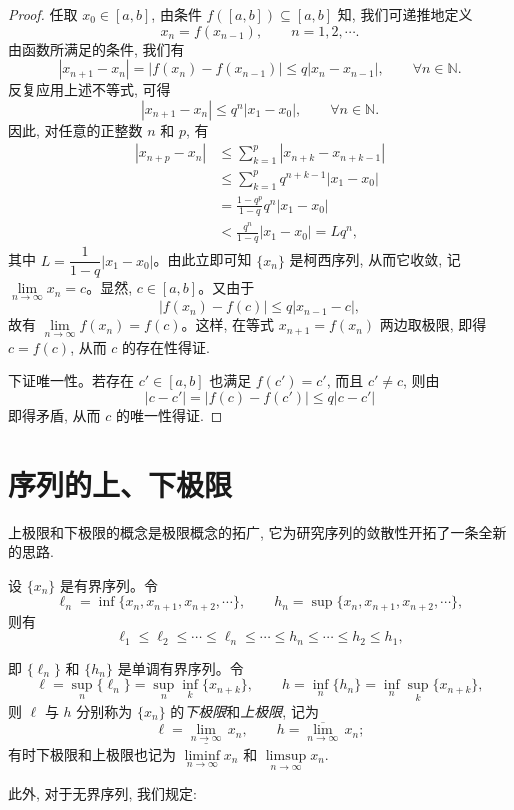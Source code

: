\begin{proof}
任取 $x_0\in[a,b]$, 由条件 $f([a,b])\subseteq[a,b]$ 知, 我们可递推地定义
\[
  x_n=f(x_{n-1}),\qquad n=1,2,\cdots.
\]
由函数所满足的条件, 我们有
\[
  |x_{n+1}-x_n|
  =
  |f(x_n)-f(x_{n-1})|
  \leqslant q|x_n-x_{n-1}|,\qquad \forall n\in\mathbb{N}.
\]
反复应用上述不等式, 可得
\[
  |x_{n+1}-x_n|\leqslant q^n|x_1-x_0|,\qquad \forall n\in\mathbb{N}.
\]
因此, 对任意的正整数 $n$ 和 $p$, 有
\[
\begin{aligned}
  |x_{n+p}-x_n|
  &\leqslant \sum_{k=1}^p |x_{n+k}-x_{n+k-1}|\\
  &\leqslant \sum_{k=1}^p q^{n+k-1}|x_1-x_0|\\
  &=
  \frac{1-q^p}{1-q}q^n|x_1-x_0|\\
  &<
  \frac{q^n}{1-q}|x_1-x_0|=Lq^n,
\end{aligned}
\]
其中 $L=\dfrac1{1-q}|x_1-x_0|$。由此立即可知 $\{x_n\}$ 是柯西序列, 从而它收敛, 记 $\lim\limits_{n\to\infty}x_n=c$。显然, $c\in[a,b]$。又由于
\[
  |f(x_n)-f(c)|\leqslant q|x_{n-1}-c|,
\]
故有 $\lim\limits_{n\to\infty}f(x_n)=f(c)$。这样, 在等式 $x_{n+1}=f(x_n)$ 两边取极限, 即得 $c=f(c)$, 从而 $c$ 的存在性得证.

下证唯一性。若存在 $c'\in[a,b]$ 也满足 $f(c')=c'$, 而且 $c'\ne c$, 则由
\[
  |c-c'|=|f(c)-f(c')|\leqslant q|c-c'|
\]
即得矛盾, 从而 $c$ 的唯一性得证.
\end{proof}


\section{序列的上、下极限}
\label{sec:ma-2-5}

上极限和下极限的概念是极限概念的拓广, 它为研究序列的敛散性开拓了一条全新的思路.

设 $\{x_n\}$ 是有界序列。令
\[
  \ell_n=\inf\{x_n,x_{n+1},x_{n+2},\cdots\},
  \qquad
  h_n=\sup\{x_n,x_{n+1},x_{n+2},\cdots\},
\]
则有
\[
  \ell_1\leqslant\ell_2\leqslant\cdots\leqslant\ell_n\leqslant\cdots\leqslant h_n\leqslant\cdots\leqslant h_2\leqslant h_1,
\]

即 $\{\ell_n\}$ 和 $\{h_n\}$ 是单调有界序列。令
\[
  \ell=\sup_n\{\ell_n\}=\sup_n\inf_k\{x_{n+k}\},
  \qquad
  h=\inf_n\{h_n\}=\inf_n\sup_k\{x_{n+k}\},
\]
则 $\ell$ 与 $h$ 分别称为 $\{x_n\}$ 的\emph{下极限}和\emph{上极限}, 记为
\[
  \ell=\underline{\lim_{n\to\infty}}\,x_n,\qquad
  h=\overline{\lim_{n\to\infty}}\,x_n;
\]
有时下极限和上极限也记为 $\liminf\limits_{n\to\infty}x_n$ 和 $\limsup\limits_{n\to\infty}x_n$.

此外, 对于无界序列, 我们规定:

